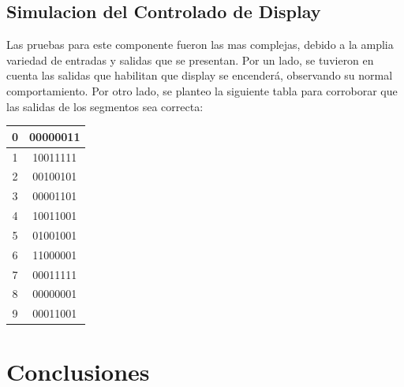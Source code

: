 \documentclass[a4paper,10pt]{article}
\begin{document}
	\subsection{Simulacion del Controlado de Display}
	Las pruebas para este componente fueron las mas complejas, debido a la amplia variedad de entradas y salidas que se presentan. Por un lado, se tuvieron en cuenta las salidas que habilitan que display se encenderá, observando su normal comportamiento. Por otro lado, se planteo la siguiente tabla para corroborar que las salidas de los segmentos sea correcta:
		\begin{center}
			\begin{tabular}{|c|c|}
				0 & 00000011 \\ \hline
				1 & 10011111 \\ \hline
				2 & 00100101 \\ \hline
				3 & 00001101 \\ \hline
				4 & 10011001 \\ \hline
				5 & 01001001 \\ \hline
				6 & 11000001 \\ \hline
				7 & 00011111 \\ \hline
				8 & 00000001 \\ \hline
				9 & 00011001 \\ \hline
			\end{tabular}
		\end{center}

\section{Conclusiones}
\end{document}
